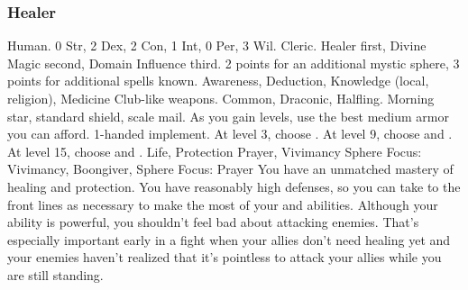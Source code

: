         \subsubsection{Healer}
             Human.
             0 Str, 2 Dex, 2 Con, 1 Int, 0 Per, 3 Wil.
             Cleric.
             Healer first, Divine Magic second, Domain Influence third.
             2 points for an additional mystic sphere, 3 points for additional spells known.
             Awareness, Deduction, Knowledge (local, religion), Medicine
             Club-like weapons.
             Common, Draconic, Halfling.
             Morning star, standard shield, scale mail. As you gain levels, use the best medium armor you can afford.
             1-handed implement.
                At level 3, choose .
                At level 9, choose  and .
                At level 15, choose  and .
             Life, Protection
             Prayer, Vivimancy
             Sphere Focus: Vivimancy, Boongiver, Sphere Focus: Prayer
             You have an unmatched mastery of healing and protection.
            You have reasonably high defenses, so you can take to the front lines as necessary to make the most of your  and  abilities.
            Although your  ability is powerful, you shouldn't feel bad about attacking enemies.
            That's especially important early in a fight when your allies don't need healing yet and your enemies haven't realized that it's pointless to attack your allies while you are still standing.

